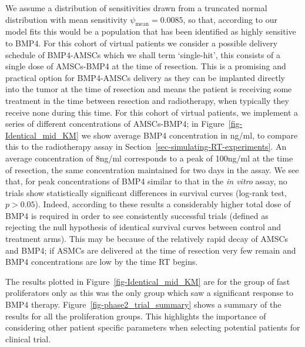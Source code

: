 \documentclass[
  letterpaper,
]{scrreprt}
\theoremstyle{definition}
\theoremstyle{remark}
\begin{document}
We assume a distribution of sensitivities drawn from a truncated normal
distribution with mean sensitivity \(\psi_\text{mean} = 0.0085\), so
that, according to our model fits this would be a population that has
been identified as highly sensitive to BMP4. For this cohort of virtual
patients we consider a possible delivery schedule of BMP4-AMSCs which we
shall term `single-hit', this consists of a single dose of AMSCs-BMP4 at
the time of resection. This is a promising and practical option for
BMP4-AMSCs delivery as they can be implanted directly into the tumor at
the time of resection and means the patient is receiving some treatment
in the time between resection and radiotherapy, when typically they
receive none during this time. For this cohort of virtual patients, we
implement a series of different concentrations of AMSCs-BMP4; in
Figure~\ref{fig-Identical_mid_KM} we show average BMP4 concentration in
ng/ml, to compare this to the radiotherapy assay in
Section~\ref{sec-simulating-RT-experiments}. An average concentration of
8ng/ml corresponds to a peak of 100ng/ml at the time of resection, the
same concentration maintained for two days in the assay. We see that,
for peak concentrations of BMP4 similar to that in the \emph{in vitro}
assay, no trials show statistically significant differences in survival
curves (log-rank test, \(p>0.05\)). Indeed, according to these results a
considerably higher total dose of BMP4 is required in order to see
consistently successful trials (defined as rejecting the null hypothesis
of identical survival curves between control and treatment arms). This
may be because of the relatively rapid decay of AMSCs and BMP4; if ASMCs
are delivered at the time of resection very few remain and BMP4
concentrations are low by the time RT begins.

The results plotted in Figure~\ref{fig-Identical_mid_KM} are for the
group of fast proliferators only as this was the only group which saw a
significant response to BMP4 therapy.
Figure~\ref{fig-phase2_trial_summary} shows a summary of the results for
all the proliferation groups. This highlights the importance of
considering other patient specific parameters when selecting potential
patients for clinical trial.
\end{document}
